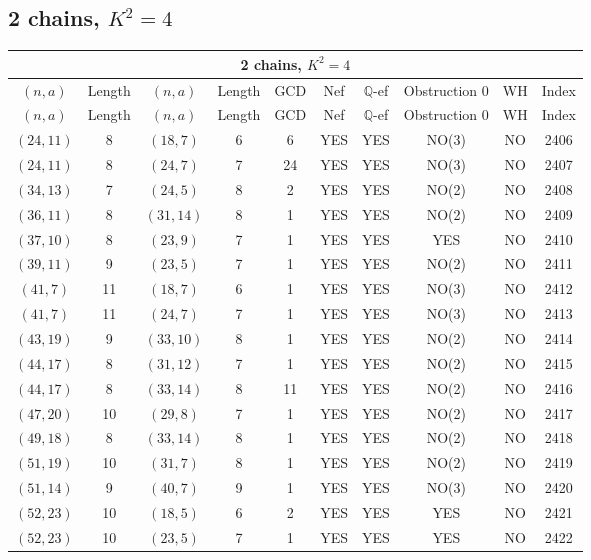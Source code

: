\subsection{2 chains, $K^2 = 4$}
\begin{longtable}{|c|c|c|c|c|c|c|c|c|c|}
\hline
\multicolumn{10}{|c|}{2 chains, $K^2 = 4$}\\
\hline
$(n,a)$ & Length & $(n,a)$ & Length & GCD & Nef & $\mathbb Q$-ef & Obstruction 0 & WH & Index\\
\hline
\endfirsthead

\hline
$(n,a)$ & Length & $(n,a)$ & Length & GCD & Nef & $\mathbb Q$-ef & Obstruction 0 & WH & Index\\
\hline
\endhead
\hline
\endfoot

$(24, 11)$ & 8 & $(18, 7)$ & 6 & 6 & YES & YES & NO(3) & NO & 2406\\
$(24, 11)$ & 8 & $(24, 7)$ & 7 & 24 & YES & YES & NO(3) & NO & 2407\\
$(34, 13)$ & 7 & $(24, 5)$ & 8 & 2 & YES & YES & NO(2) & NO & 2408\\
$(36, 11)$ & 8 & $(31, 14)$ & 8 & 1 & YES & YES & NO(2) & NO & 2409\\
$(37, 10)$ & 8 & $(23, 9)$ & 7 & 1 & YES & YES & YES & NO & 2410\\
$(39, 11)$ & 9 & $(23, 5)$ & 7 & 1 & YES & YES & NO(2) & NO & 2411\\
$(41, 7)$ & 11 & $(18, 7)$ & 6 & 1 & YES & YES & NO(3) & NO & 2412\\
$(41, 7)$ & 11 & $(24, 7)$ & 7 & 1 & YES & YES & NO(3) & NO & 2413\\
$(43, 19)$ & 9 & $(33, 10)$ & 8 & 1 & YES & YES & NO(2) & NO & 2414\\
$(44, 17)$ & 8 & $(31, 12)$ & 7 & 1 & YES & YES & NO(2) & NO & 2415\\
$(44, 17)$ & 8 & $(33, 14)$ & 8 & 11 & YES & YES & NO(2) & NO & 2416\\
$(47, 20)$ & 10 & $(29, 8)$ & 7 & 1 & YES & YES & NO(2) & NO & 2417\\
$(49, 18)$ & 8 & $(33, 14)$ & 8 & 1 & YES & YES & NO(2) & NO & 2418\\
$(51, 19)$ & 10 & $(31, 7)$ & 8 & 1 & YES & YES & NO(2) & NO & 2419\\
$(51, 14)$ & 9 & $(40, 7)$ & 9 & 1 & YES & YES & NO(3) & NO & 2420\\
$(52, 23)$ & 10 & $(18, 5)$ & 6 & 2 & YES & YES & YES & NO & 2421\\
$(52, 23)$ & 10 & $(23, 5)$ & 7 & 1 & YES & YES & YES & NO & 2422\\

\end{longtable}
